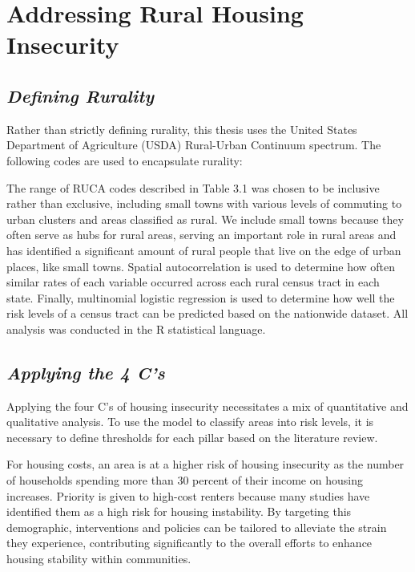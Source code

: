 \chapter{Addressing Rural Housing Insecurity}	%

\section{\textit{Defining Rurality}}
Rather than strictly defining rurality, this thesis uses the United States Department of Agriculture (USDA) Rural-Urban Continuum spectrum. The following codes are used to encapsulate rurality:




The range of RUCA codes described in Table 3.1 was chosen to be inclusive rather than exclusive, including small towns with various levels of commuting to urban clusters and areas classified as rural. We include small towns because they often serve as hubs for rural areas, serving an important role in rural areas and \citet{isserman_national_2005} has identified a significant amount of rural people that live on the edge of urban places, like small towns. Spatial autocorrelation is used to determine how often similar rates of each variable occurred across each rural census tract in each state. Finally, multinomial logistic regression is used to determine how well the risk levels of a census tract can be predicted based on the nationwide dataset.  All analysis was conducted in the R statistical language.  

\section{\textit{Applying the 4 C's}}
Applying the four C's of housing insecurity necessitates a mix of quantitative and qualitative analysis. To use the model to classify areas into risk levels, it is necessary to define thresholds for each pillar based on the literature review. 

For housing costs, an area is at a higher risk of housing insecurity as the number of households spending more than 30 percent of their income on housing increases. Priority is given to high-cost renters because many studies have identified them as a high risk for housing instability. By targeting this demographic, interventions and policies can be tailored to alleviate the strain they experience, contributing significantly to the overall efforts to enhance housing stability within communities.

